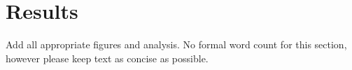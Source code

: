 \section*{Results}
Add all appropriate figures and analysis.
No formal word count for this section, however
please keep text as concise as possible.